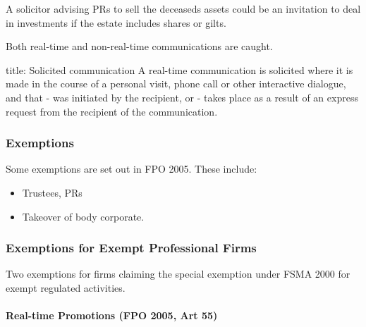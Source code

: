 \documentclass[
]{article}
\newenvironment{Shaded}{}{}
\newcommand{\NormalTok}[1]{#1}
\providecommand{\tightlist}{%
  \setlength{\itemsep}{0pt}\setlength{\parskip}{0pt}}
\begin{document}
\begin{Shaded}
\begin{Highlighting}[]
\NormalTok{A solicitor advising PRs to sell the deceased\textquotesingle{}s assets could be an invitation to deal in investments if the estate includes shares or gilts.}
\end{Highlighting}
\end{Shaded}

Both real-time and non-real-time communications are caught.

\begin{Shaded}
\begin{Highlighting}[]
\NormalTok{title: Solicited communication}
\NormalTok{A real{-}time communication is solicited where it is made in the course of a personal visit, phone call or other interactive dialogue, and that}
\NormalTok{{-} was initiated by the recipient, or}
\NormalTok{{-} takes place as a result of an express request from the recipient of the communication. }
\end{Highlighting}
\end{Shaded}

\hypertarget{exemptions}{%
\subsubsection{Exemptions}\label{exemptions}}

Some exemptions are set out in FPO 2005. These include:

\begin{itemize}
\tightlist
\item
  Trustees, PRs
\item
  Takeover of body corporate.
\end{itemize}

\hypertarget{exemptions-for-exempt-professional-firms}{%
\subsubsection{Exemptions for Exempt Professional
Firms}\label{exemptions-for-exempt-professional-firms}}

Two exemptions for firms claiming the special exemption under FSMA 2000
for exempt regulated activities.

\hypertarget{real-time-promotions-fpo-2005-art-55}{%
\paragraph{Real-time Promotions (FPO 2005, Art
55)}\label{real-time-promotions-fpo-2005-art-55}}
\end{document}
